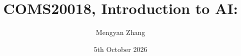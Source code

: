 \usepackage{amsmath, amssymb, graphicx}
\usepackage[]{algorithm2e}
\usepackage{pdfpages}
\usepackage{bm}
\usepackage{relsize}
\usepackage[british]{babel}
\usepackage{tikz,tikzsymbols}
\usepackage{hyperref}
\usepackage{cancel}
\usepackage{caption,subcaption}
\usepackage{adjustbox}
\usepackage{overpic}
\usepackage[UKenglish]{isodate}

\usetikzlibrary{arrows,decorations.markings,decorations.pathreplacing,positioning}

\newcommand{\bs}{\boldsymbol}


\hypersetup{colorlinks,linkcolor=,urlcolor=blue}
\newenvironment{titledslide}[1]{\begin{frame}\frametitle{#1}}{\end{frame}}



\author{Mengyan Zhang}

\title{COMS20018, Introduction to AI:\\ \vspace{5pt} \lecttitle}

\date{5th October 2026}

